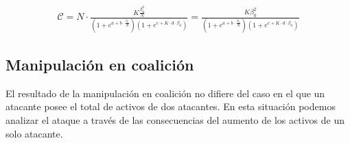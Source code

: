 \begin{align}
\mathcal{C} = N \cdot \frac{K \frac{\beta_0 ^2}{N}}{ (1+e^{a + b \cdot \frac{\beta_0}{N} }) (1+e^{c + K \cdot d \cdot \beta_0})} = \frac{K \beta_0 ^2 }{ (1+e^{a + b \cdot \frac{\beta_0}{N} }) (1+e^{c + K \cdot d \cdot \beta_0})}
\end{align}


\subsection{Manipulación en coalición \label{sec:coalition}}

El resultado de la manipulación en coalición no difiere del caso en el que un atacante posee el total de activos de dos atacantes. En esta situación podemos analizar el ataque a través de las consecuencias del aumento de los activos de un solo atacante.